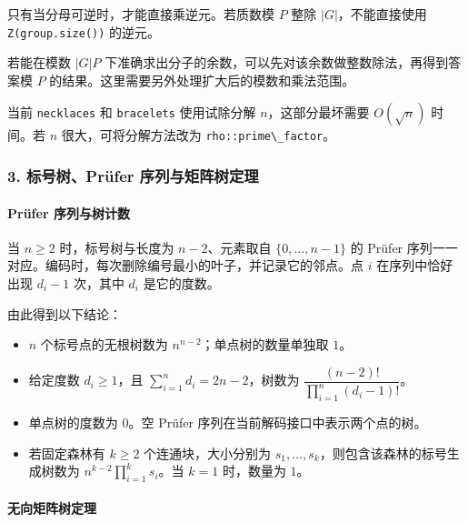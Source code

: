 只有当分母可逆时，才能直接乘逆元。若质数模 \(P\) 整除 \(|G|\)，不能直接使用 \passthrough{\lstinline!Z(group.size())!} 的逆元。

若能在模数 \(|G|P\) 下准确求出分子的余数，可以先对该余数做整数除法，再得到答案模 \(P\) 的结果。这里需要另外处理扩大后的模数和乘法范围。

当前 \passthrough{\lstinline!necklaces!} 和 \passthrough{\lstinline!bracelets!} 使用试除分解 \(n\)，这部分最坏需要 \(O(\sqrt n)\) 时间。若 \(n\) 很大，可将分解方法改为 \passthrough{\lstinline!rho::prime\_factor!}。

\hypertarget{ux6807ux53f7ux6811pruxfcfer-ux5e8fux5217ux4e0eux77e9ux9635ux6811ux5b9aux7406}{%
\subsubsection{3. 标号树、Prüfer 序列与矩阵树定理}\label{ux6807ux53f7ux6811pruxfcfer-ux5e8fux5217ux4e0eux77e9ux9635ux6811ux5b9aux7406}}

\hypertarget{pruxfcfer-ux5e8fux5217ux4e0eux6811ux8ba1ux6570}{%
\paragraph{Prüfer 序列与树计数}\label{pruxfcfer-ux5e8fux5217ux4e0eux6811ux8ba1ux6570}}

当 \(n\ge2\) 时，标号树与长度为 \(n-2\)、元素取自 \(\{0,\ldots,n-1\}\) 的 Prüfer 序列一一对应。编码时，每次删除编号最小的叶子，并记录它的邻点。点 \(i\) 在序列中恰好出现 \(d_i-1\) 次，其中 \(d_i\) 是它的度数。

由此得到以下结论：

\begin{itemize}
\tightlist
\item
  \(n\) 个标号点的无根树数为 \(n^{n-2}\)；单点树的数量单独取 \(1\)。
\item
  给定度数 \(d_i\ge1\)，且 \(\sum_{i=1}^{n}d_i=2n-2\)，树数为 \(\dfrac{(n-2)!}{\prod_{i=1}^{n}(d_i-1)!}\)。
\item
  单点树的度数为 \(0\)。空 Prüfer 序列在当前解码接口中表示两个点的树。
\item
  若固定森林有 \(k\ge2\) 个连通块，大小分别为 \(s_1,\ldots,s_k\)，则包含该森林的标号生成树数为 \(n^{k-2}\prod_{i=1}^{k}s_i\)。当 \(k=1\) 时，数量为 \(1\)。
\end{itemize}

\hypertarget{ux65e0ux5411ux77e9ux9635ux6811ux5b9aux7406}{%
\paragraph{无向矩阵树定理}\label{ux65e0ux5411ux77e9ux9635ux6811ux5b9aux7406}}

